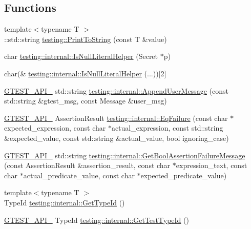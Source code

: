 \subsection*{Functions}
\begin{DoxyCompactItemize}
\item 
{\footnotesize template$<$typename T $>$ }\\\+::std\+::string \hyperlink{namespacetesting_aa5717bb1144edd1d262d310ba70c82ed}{testing\+::\+Print\+To\+String} (const T \&value)
\item 
char \hyperlink{namespacetesting_1_1internal_afb0731ba39ffef1fa1730ac0699c9025}{testing\+::internal\+::\+Is\+Null\+Literal\+Helper} (Secret $\ast$p)
\item 
char(\& \hyperlink{namespacetesting_1_1internal_ab53ecfa1632a871ce7c692d722a75a57}{testing\+::internal\+::\+Is\+Null\+Literal\+Helper} (...))\mbox{[}2\mbox{]}
\item 
\hyperlink{gtest-port_8h_aa73be6f0ba4a7456180a94904ce17790}{G\+T\+E\+S\+T\+\_\+\+A\+P\+I\+\_\+} std\+::string \hyperlink{namespacetesting_1_1internal_af69e146a989e8d48def39a0cc59461c9}{testing\+::internal\+::\+Append\+User\+Message} (const std\+::string \&gtest\+\_\+msg, const Message \&user\+\_\+msg)
\item 
\hyperlink{gtest-port_8h_aa73be6f0ba4a7456180a94904ce17790}{G\+T\+E\+S\+T\+\_\+\+A\+P\+I\+\_\+} Assertion\+Result \hyperlink{namespacetesting_1_1internal_ac61e2ba2cbf259fd6ee5ffd4e49c9445}{testing\+::internal\+::\+Eq\+Failure} (const char $\ast$expected\+\_\+expression, const char $\ast$actual\+\_\+expression, const std\+::string \&expected\+\_\+value, const std\+::string \&actual\+\_\+value, bool ignoring\+\_\+case)
\item 
\hyperlink{gtest-port_8h_aa73be6f0ba4a7456180a94904ce17790}{G\+T\+E\+S\+T\+\_\+\+A\+P\+I\+\_\+} std\+::string \hyperlink{namespacetesting_1_1internal_aed8d3ad4341f8f2de53440e39c995632}{testing\+::internal\+::\+Get\+Bool\+Assertion\+Failure\+Message} (const Assertion\+Result \&assertion\+\_\+result, const char $\ast$expression\+\_\+text, const char $\ast$actual\+\_\+predicate\+\_\+value, const char $\ast$expected\+\_\+predicate\+\_\+value)
\item 
{\footnotesize template$<$typename T $>$ }\\Type\+Id \hyperlink{namespacetesting_1_1internal_a6b108e56fdc68ea937ffb3759fb55ab0}{testing\+::internal\+::\+Get\+Type\+Id} ()
\item 
\hyperlink{gtest-port_8h_aa73be6f0ba4a7456180a94904ce17790}{G\+T\+E\+S\+T\+\_\+\+A\+P\+I\+\_\+} Type\+Id \hyperlink{namespacetesting_1_1internal_a1e85cf16bb95b60f879d48ba1fbfc1c9}{testing\+::internal\+::\+Get\+Test\+Type\+Id} ()

\end{DoxyCompactItemize}

